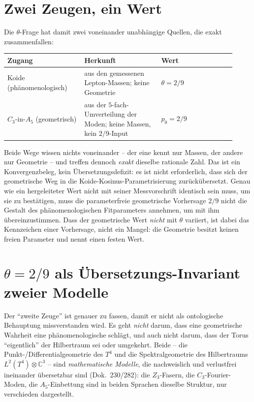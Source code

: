 \section{Zwei Zeugen, ein Wert}
Die $\theta$-Frage hat damit zwei voneinander unabhängige Quellen, die exakt zusammenfallen:
\begin{center}
\begin{tabular}{@{}p{0.31\linewidth}p{0.31\linewidth}p{0.30\linewidth}@{}}
\toprule
\textbf{Zugang} & \textbf{Herkunft} & \textbf{Wert}\\
\midrule
Koide (phänomenologisch) & aus den gemessenen Lepton-Massen; keine Geometrie & $\theta=2/9$\\
$C_3$-in-$A_5$ (geometrisch) & aus der $5$-fach-Umverteilung der Moden; keine Massen, kein $2/9$-Input & $p_0=2/9$\\
\bottomrule
\end{tabular}
\end{center}
Beide Wege wissen nichts voneinander -- der eine kennt nur Massen, der andere nur Geometrie --
und treffen dennoch \emph{exakt} dieselbe rationale Zahl. Das ist ein Konvergenzbeleg, kein
Übersetzungsdefizit: es ist nicht erforderlich, dass sich der geometrische Weg in die
Koide-Kosinus-Parametrisierung zurückübersetzt. Genau wie ein hergeleiteter Wert nicht mit
seiner Messvorschrift identisch sein muss, um sie zu bestätigen, muss die parameterfreie
geometrische Vorhersage $2/9$ nicht die Gestalt des phänomenologischen Fitparameters annehmen,
um mit ihm übereinzustimmen. Dass der geometrische Wert \emph{nicht} mit $\theta$ variiert,
ist dabei das Kennzeichen einer Vorhersage, nicht ein Mangel: die Geometrie besitzt keinen
freien Parameter und nennt einen festen Wert.

\section{$\theta=2/9$ als Übersetzungs-Invariant zweier Modelle}
Der \enquote{zweite Zeuge} ist genauer zu fassen, damit er nicht als ontologische Behauptung
missverstanden wird. Es geht \emph{nicht} darum, dass eine geometrische Wahrheit eine
phänomenologische schlägt, und auch nicht darum, dass der Torus \enquote{eigentlich} der
Hilbertraum sei oder umgekehrt. Beide -- die Punkt-\slash Differentialgeometrie des $T^4$ und die
Spektralgeometrie des Hilbertraums $L^2(T^4)\otimes\mathbb{C}^3$ -- sind \emph{mathematische
Modelle}, die nachweislich und verlustfrei ineinander übersetzbar sind (Dok.~230/282): die
$Z_3$-Fasern, die $C_3$-Fourier-Moden, die $A_5$-Einbettung sind in beiden Sprachen dieselbe
Struktur, nur verschieden dargestellt.

